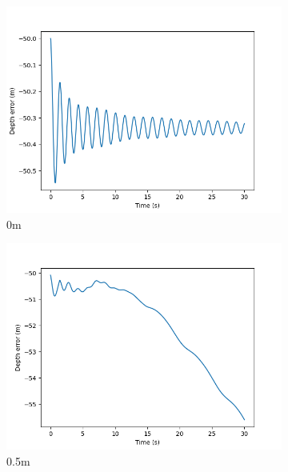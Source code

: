 \documentclass[class=article, crop=false]{standalone}
\begin{document}
\begin{figure}
    \centering
    \begin{subfigure}[b]{0.48\textwidth}
        \centering
        \includegraphics{scenario1/rov-50m/0.0m/rov_depth_error_uncontrolled}
        \caption{0m}
        \label{}
    \end{subfigure}
    \hfill
    \begin{subfigure}[b]{0.48\textwidth}
        \centering
        \includegraphics{scenario1/rov-50m/0.5m/rov_depth_error_uncontrolled}
        \caption{0.5m}
        \label{}
    \end{subfigure}
    \vfill
    \begin{subfigure}[b]{0.48\textwidth}
        \centering

\end{subfigure}
\end{figure}
\end{document}
